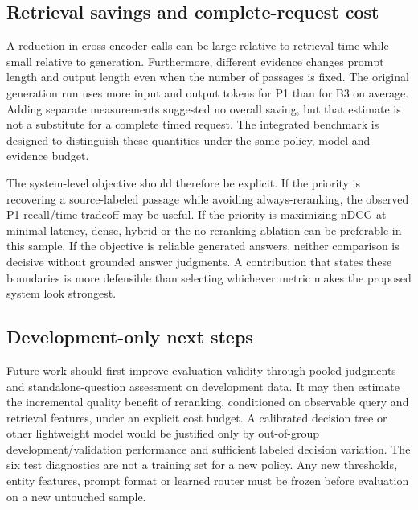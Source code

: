 \documentclass[10pt,a4paper]{article}
\begin{document}
\hypertarget{retrieval-savings-and-complete-request-cost}{%
\subsection{Retrieval savings and complete-request
cost}\label{retrieval-savings-and-complete-request-cost}}

A reduction in cross-encoder calls can be large relative to retrieval
time while small relative to generation. Furthermore, different evidence
changes prompt length and output length even when the number of passages
is fixed. The original generation run uses more input and output tokens
for P1 than for B3 on average. Adding separate measurements suggested no
overall saving, but that estimate is not a substitute for a complete
timed request. The integrated benchmark is designed to distinguish these
quantities under the same policy, model and evidence budget.

The system-level objective should therefore be explicit. If the priority
is recovering a source-labeled passage while avoiding always-reranking,
the observed P1 recall/time tradeoff may be useful. If the priority is
maximizing nDCG at minimal latency, dense, hybrid or the no-reranking
ablation can be preferable in this sample. If the objective is reliable
generated answers, neither comparison is decisive without grounded
answer judgments. A contribution that states these boundaries is more
defensible than selecting whichever metric makes the proposed system
look strongest.

\hypertarget{development-only-next-steps}{%
\subsection{Development-only next
steps}\label{development-only-next-steps}}

Future work should first improve evaluation validity through pooled
judgments and standalone-question assessment on development data. It may
then estimate the incremental quality benefit of reranking, conditioned
on observable query and retrieval features, under an explicit cost
budget. A calibrated decision tree or other lightweight model would be
justified only by out-of-group development/validation performance and
sufficient labeled decision variation. The six test diagnostics are not
a training set for a new policy. Any new thresholds, entity features,
prompt format or learned router must be frozen before evaluation on a
new untouched sample.
\end{document}
